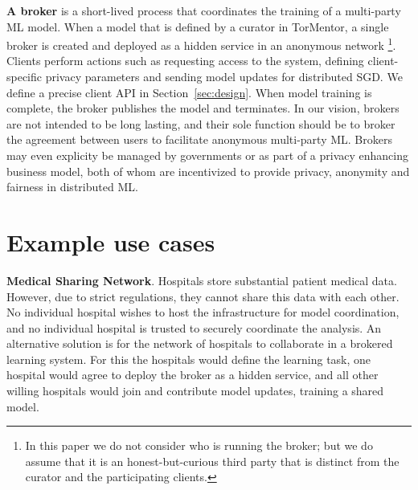 
\textbf{A broker} is a short-lived process that coordinates the
training of a multi-party ML model. When a model that is defined by a
curator in TorMentor, a single broker is created and deployed as a
hidden service in an anonymous network \footnote{In this paper we do not
  consider who is running the broker; but we do assume that it is
  an honest-but-curious third party that is distinct from the
  curator and the participating clients.}.
%
Clients perform actions such as requesting access to the system, defining
client-specific privacy parameters and sending model updates for
distributed SGD. We define a precise client \ac{API} in 
Section~\ref{sec:design}. When model training is complete, the broker
publishes the model and terminates. In our vision, brokers are not
intended to be long lasting, and their sole function should be to
broker the agreement between users to facilitate anonymous multi-party
ML. Brokers may even explicity be managed by governments or as part of
a privacy enhancing business model, both of whom are incentivized to
provide privacy, anonymity and fairness in distributed ML.


\section{Example use cases}

\noindent \textbf{Medical Sharing Network}. Hospitals store substantial
patient medical data. However, due to strict regulations, they 
cannot share this data with each other. No individual
hospital wishes to host the infrastructure for model coordination, and
no individual hospital is trusted to securely coordinate the analysis.
An alternative solution is for the network of hospitals to collaborate in
a brokered learning system. For this the hospitals would define the
learning task, one hospital would agree to deploy the broker as a
hidden service, and all other willing hospitals would join and
contribute model updates, training a shared model. \\


